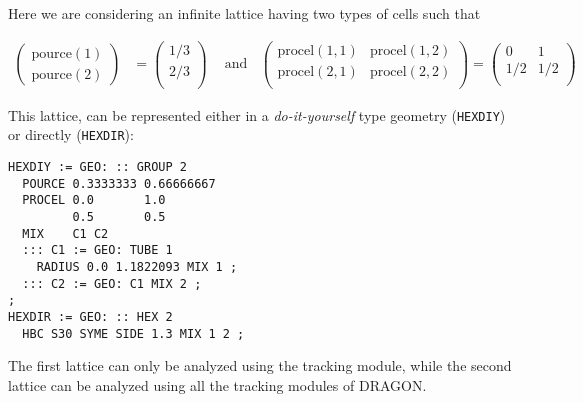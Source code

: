 \begin{itemize}
Here we are considering an infinite lattice having two types of cells such
that

\begin{align*}
\begin{pmatrix}\text{pource}(1) \\ \text{pource}(2) \end{pmatrix}&=
\begin{pmatrix}1/3 \\ 2/3 \\ \end{pmatrix}\ \ \ \ \text{ and} \ \ \ \ 
\begin{pmatrix} \text{procel}(1,1) & \text{procel}(1,2) \\ \text{procel}(2,1) & \text{procel}(2,2) \\ \end{pmatrix}=
\begin{pmatrix}0 & 1 \\ 1/2 & 1/2 \\ \end{pmatrix}
\end{align*}

This lattice, can be represented either in a {\sl do-it-yourself} type geometry
({\tt HEXDIY}) or directly ({\tt HEXDIR}):

\begin{verbatim}
HEXDIY := GEO: :: GROUP 2
  POURCE 0.3333333 0.66666667
  PROCEL 0.0       1.0
         0.5       0.5
  MIX    C1 C2
  ::: C1 := GEO: TUBE 1
    RADIUS 0.0 1.1822093 MIX 1 ;
  ::: C2 := GEO: C1 MIX 2 ;
;
HEXDIR := GEO: :: HEX 2
  HBC S30 SYME SIDE 1.3 MIX 1 2 ;
\end{verbatim}

The first lattice can only be analyzed using the  tracking module,
while the second lattice can be analyzed using all the tracking
modules of DRAGON. 

\end{itemize}

\eject
